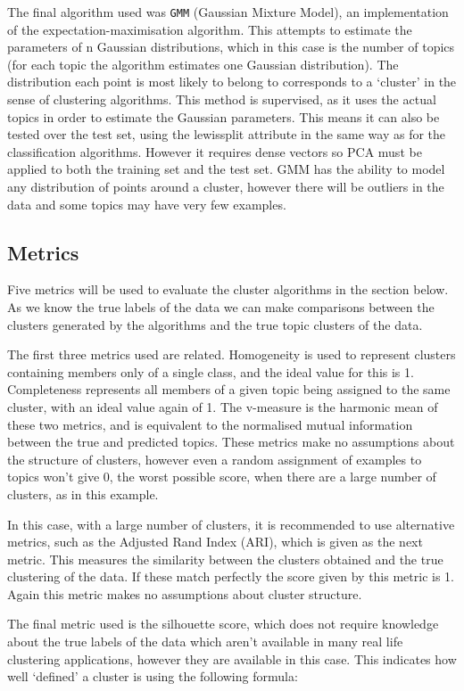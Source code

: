 \documentclass{article}
\begin{document}
The final algorithm used was \verb|GMM| (Gaussian Mixture Model), an implementation of the expectation-maximisation algorithm. This attempts to estimate the parameters of n Gaussian distributions, which in this case is the number of topics (for each topic the algorithm estimates one Gaussian distribution). The distribution each point is most likely to belong to corresponds to a `cluster' in the sense of clustering algorithms. This method is supervised, as it uses the actual topics in order to estimate the Gaussian parameters. This means it can also be tested over the test set, using the lewissplit attribute in the same way as for the classification algorithms. However it requires dense vectors so PCA must be applied to both the training set and the test set. GMM has the ability to model any distribution of points around a cluster, however there will be outliers in the data and some topics may have very few examples.

\subsection{Metrics}
Five metrics will be used to evaluate the cluster algorithms in the section below. As we know the true labels of the data we can make comparisons between the clusters generated by the algorithms and the true topic clusters of the data.

The first three metrics used are related. Homogeneity is used to represent clusters containing members only of a single class, and the ideal value for this is 1. Completeness represents all members of a given topic being assigned to the same cluster, with an ideal value again of 1. The v-measure is the harmonic mean of these two metrics, and is equivalent to the normalised mutual information between the true and predicted topics. These metrics make no assumptions about the structure of clusters, however even a random assignment of examples to topics won't give 0, the worst possible score, when there are a large number of clusters, as in this example.

In this case, with a large number of clusters, it is recommended to use alternative metrics, such as the Adjusted Rand Index (ARI), which is given as the next metric. This measures the similarity between the clusters obtained and the true clustering of the data. If these match perfectly the score given by this metric is 1. Again this metric makes no assumptions about cluster structure.

The final metric used is the silhouette score, which does not require knowledge about the true labels of the data which aren't available in many real life clustering applications, however they are available in this case.  This indicates how well `defined' a cluster is using the following formula:
\end{document}
